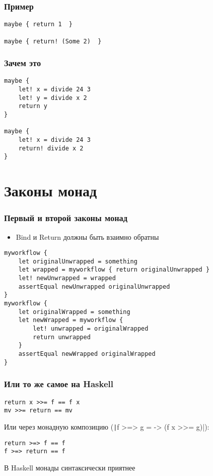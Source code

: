 \documentclass{../../slides-style}
\begin{document}
    \begin{frame}[fragile]
        \frametitle{Пример}
        \begin{verbatim}
maybe { return 1  }

maybe { return! (Some 2)  }
        \end{verbatim}
    \end{frame}

    \begin{frame}[fragile]
        \frametitle{Зачем это}
        \begin{verbatim}
maybe {
    let! x = divide 24 3
    let! y = divide x 2
    return y 
}

maybe {
    let! x = divide 24 3
    return! divide x 2  
}
        \end{verbatim}
    \end{frame}

    \section{Законы монад}

    \begin{frame}[fragile]
        \frametitle{Первый и второй законы монад}
        \begin{itemize}
            \item Bind и Return должны быть взаимно обратны
        \end{itemize}
        \begin{footnotesize}
            \begin{verbatim}
myworkflow {
    let originalUnwrapped = something
    let wrapped = myworkflow { return originalUnwrapped }
    let! newUnwrapped = wrapped
    assertEqual newUnwrapped originalUnwrapped 
}
myworkflow {
    let originalWrapped = something
    let newWrapped = myworkflow { 
        let! unwrapped = originalWrapped
        return unwrapped
    }
    assertEqual newWrapped originalWrapped
}
            \end{verbatim}
        \end{footnotesize}
    \end{frame}

    \begin{frame}[fragile]
        \frametitle{Или то же самое на Haskell}
        \begin{verbatim}
return x >>= f == f x
mv >>= return == mv
        \end{verbatim}
        \vspace{5mm}
        Или через монадную композицию (\texttt|f >=> g = \x -> (f x >>= g)|):
        \begin{verbatim}
return >=> f == f
f >=> return == f
        \end{verbatim}
        \vspace{5mm}
        В Haskell монады синтаксически приятнее
    \end{frame}
\end{document}
